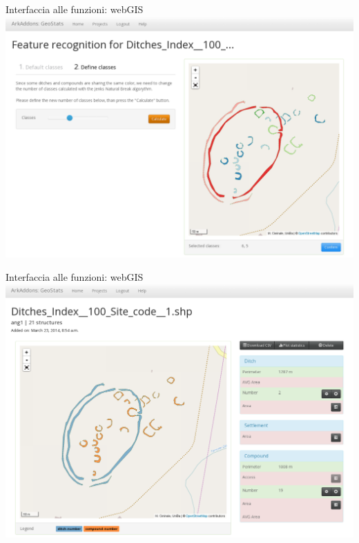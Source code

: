 \documentclass[xcolor=svgnames]{beamer}
\begin{document}
        \begin{frame}{Interfaccia alle funzioni: webGIS}
            \includegraphics[width=1\textwidth]{img/shp-wizard}
        \end{frame}

        \begin{frame}{Interfaccia alle funzioni: webGIS}
            \includegraphics[width=1\textwidth]{img/shp-detail-2}
        \end{frame}
\end{document}
